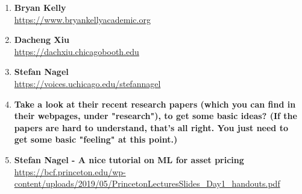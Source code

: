  
\begin{enumerate}
 
        \item\textbf{Bryan Kelly} \\
        \url{https://www.bryankellyacademic.org} 
        
        \item\textbf{Dacheng Xiu} \\
        \url{https://dachxiu.chicagobooth.edu} 
        
        \item\textbf{Stefan Nagel} \\
        \url{https://voices.uchicago.edu/stefannagel}  
        
        \item\textbf{Take a look at their recent research papers (which you can find in their webpages, under "research"), to get some basic ideas? (If the papers are hard to understand, that's all right. You just need to get some basic "feeling" at this point.) } 
         
  
        \item\textbf{Stefan Nagel - A nice tutorial on ML for asset pricing } \\
        \url{https://bcf.princeton.edu/wp-content/uploads/2019/05/PrincetonLecturesSlides_Day1_handouts.pdf} 
   
\end{enumerate}
